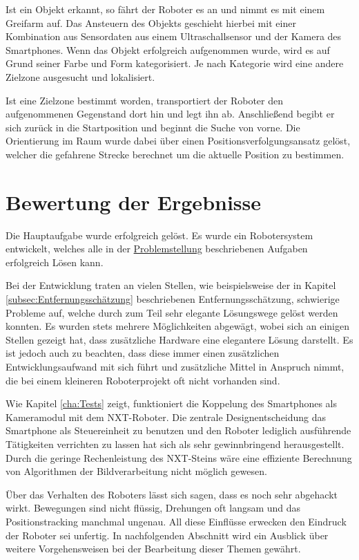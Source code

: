 Ist ein Objekt erkannt, so fährt der Roboter es an und nimmt es mit einem Greifarm auf. Das Ansteuern des Objekts geschieht hierbei mit einer Kombination aus Sensordaten aus einem Ultraschallsensor und der Kamera des Smartphones. Wenn das Objekt erfolgreich aufgenommen wurde, wird es auf Grund seiner Farbe und Form kategorisiert. Je nach Kategorie wird eine andere Zielzone ausgesucht und lokalisiert.

Ist eine Zielzone bestimmt worden, transportiert der Roboter den aufgenommenen Gegenstand dort hin und legt ihn ab. Anschließend begibt er sich zurück in die Startposition und beginnt die Suche von vorne. Die Orientierung im Raum wurde dabei über einen Positionsverfolgungsansatz gelöst, welcher die gefahrene Strecke berechnet um die aktuelle Position zu bestimmen.

\section{Bewertung der Ergebnisse}

Die Hauptaufgabe wurde erfolgreich gelöst. Es wurde ein Robotersystem entwickelt, welches alle in der \hyperref[cha:Problemstellung]{Problemstellung} beschriebenen Aufgaben erfolgreich Lösen kann. 

Bei der Entwicklung traten an vielen Stellen, wie beispielsweise der in Kapitel \ref{subsec:Entfernungsschätzung} beschriebenen Entfernungsschätzung, schwierige Probleme auf, welche durch zum Teil sehr elegante Lösungswege gelöst werden konnten. Es wurden stets mehrere Möglichkeiten abgewägt, wobei sich an einigen Stellen gezeigt hat, dass zusätzliche Hardware eine elegantere Lösung darstellt. Es ist jedoch auch zu beachten, dass diese immer einen zusätzlichen Entwicklungsaufwand mit sich führt und zusätzliche Mittel in Anspruch nimmt, die bei einem kleineren Roboterprojekt oft nicht vorhanden sind. 

Wie Kapitel \ref{cha:Tests} zeigt, funktioniert die Koppelung des Smartphones als Kameramodul mit dem NXT-Roboter. Die zentrale Designentscheidung das Smartphone als Steuereinheit zu benutzen und den Roboter lediglich ausführende Tätigkeiten verrichten zu lassen hat sich als sehr gewinnbringend herausgestellt. Durch die geringe Rechenleistung des NXT-Steins wäre eine effiziente Berechnung von Algorithmen der Bildverarbeitung nicht möglich gewesen.

Über das Verhalten des Roboters lässt sich sagen, dass es noch sehr abgehackt wirkt. Bewegungen sind nicht flüssig, Drehungen oft langsam und das Positionstracking manchmal ungenau. All diese Einflüsse erwecken den Eindruck der Roboter sei unfertig. In nachfolgenden Abschnitt wird ein Ausblick über weitere Vorgehensweisen bei der Bearbeitung dieser Themen gewährt.

